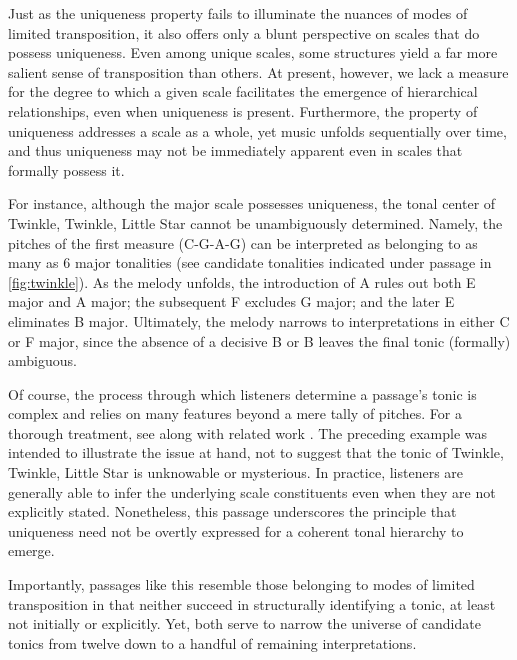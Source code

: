 \documentclass[10pt,twocolumn]{article}
\numberwithin{equation}{section} %
\begin{document}
    Just as the uniqueness property fails to illuminate the nuances of modes of limited transposition, it also offers only a blunt perspective on scales that do possess uniqueness.
    Even among unique scales, some structures yield a far more salient sense of transposition than others.
    At present, however, we lack a measure for the degree to which a given scale facilitates the emergence of hierarchical relationships, even when uniqueness is present.
    Furthermore, the property of uniqueness addresses a scale as a whole, yet music unfolds sequentially over time, and thus uniqueness may not be immediately apparent even in scales that formally possess it.

    For instance, although the major scale possesses uniqueness, the tonal center of Twinkle, Twinkle, Little Star cannot be unambiguously determined.
    Namely, the pitches of the first measure (C-G-A-G) can be interpreted as belonging to as many as 6 major tonalities (see candidate tonalities indicated under passage in \autoref{fig:twinkle}).
    As the melody unfolds, the introduction of A\text{$\natural$} rules out both E\text{$\flat$} major and A\text{$\flat$} major; the subsequent F\text{$\natural$} excludes G major; and the later E\text{$\natural$} eliminates B\text{$\flat$} major.
    Ultimately, the melody narrows to interpretations in either C or F major, since the absence of a decisive B\text{$\natural$} or B\text{$\flat$} leaves the final tonic (formally) ambiguous.

    Of course, the process through which listeners determine a passage's tonic is complex and relies on many features beyond a mere tally of pitches. For a thorough treatment, see \citet{LerdahlJackendoff1983} along with related work \citep{BharuchaKrumhansl1983,Lerdahl2004,Patel1998,Thompson1997}.
    The preceding example was intended to illustrate the issue at hand, not to suggest that the tonic of Twinkle, Twinkle, Little Star is unknowable or mysterious.
    In practice, listeners are generally able to infer the underlying scale constituents even when they are not explicitly stated.
    Nonetheless, this passage underscores the principle that uniqueness need not be overtly expressed for a coherent tonal hierarchy to emerge.

    Importantly, passages like this resemble those belonging to modes of limited transposition in that neither succeed in structurally identifying a tonic, at least not initially or explicitly.
    Yet, both serve to narrow the universe of candidate tonics from twelve down to a handful of remaining interpretations.
\end{document}
